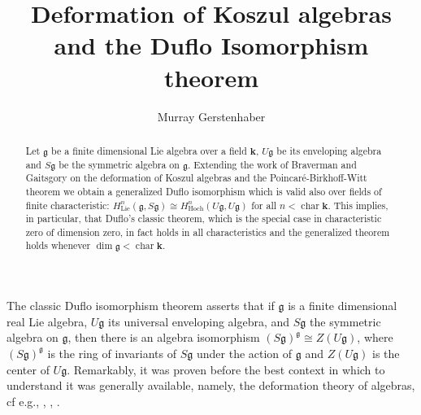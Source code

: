 \documentclass{amsart}
\begin{document}
\title{Deformation of Koszul algebras and the Duflo Isomorphism theorem}
\author{Murray Gerstenhaber}
\address{Department of Mathematics\\  University of Pennsylvania\\
  Philadelphia, PA 19104-6395, USA}

\begin{abstract}\noindent
Let $\mathfrak g$ be a finite dimensional Lie algebra over a field  $\mathbf k$, $U\mathfrak g$  be its enveloping algebra and $S\mathfrak g$ be the symmetric algebra on $\mathfrak g$. 
Extending the work of Braverman and Gaitsgory on the deformation of Koszul algebras and the   Poincar{\'e}-Birkhoff-Witt theorem we obtain a generalized Duflo isomorphism which is valid also over fields of finite characteristic: $H_{\text{Lie}}^n(\mathfrak g, S\mathfrak g) \cong H_{\text{Hoch}}^n(U\mathfrak g,U\mathfrak g)$ for all $n < \operatorname{char}\mathbf k$. This implies, in particular, that Duflo's classic theorem, which is the special case in characteristic zero of dimension zero, in fact holds in all characteristics and the generalized theorem holds whenever $\dim \mathfrak g < \operatorname{char} \mathbf k$. \end{abstract}

\keywords{}
\maketitle

\newtheorem{theorem}{Theorem}
\newtheorem{corollary}{Corollary}
\newtheorem{lemma}{Lemma}
\newtheorem{defn}{Definition}

       

\vspace{-7mm}
\medskip 

The classic Duflo isomorphism theorem  \cite{Duflo:1977} asserts that if ${\mathfrak{g}}$ is a finite dimensional real Lie algebra, $U{\mathfrak{g}}$ its universal enveloping algebra, and $S{\mathfrak{g}}$ the symmetric algebra on ${\mathfrak{g}}$, then there is an algebra isomorphism
$(S{\mathfrak{g}})^{\mathfrak{g}}  \cong Z(U{\mathfrak{g}})$, where 
$(S{\mathfrak{g}})^{\mathfrak{g}}$ is the ring of invariants of $S{\mathfrak{g}}$ under the action of ${\mathfrak{g}}$ and $Z(U{\mathfrak{g}})$ is the center of $U{\mathfrak{g}}$.  Remarkably, it was proven before the best context in which to understand it was generally available, namely, the deformation theory of algebras, cf e.g., \cite{G:Def1},  \cite{G:Def3}, \cite{G:Def4}.
\end{document}
